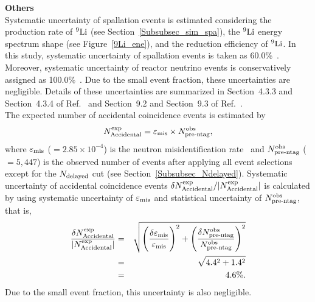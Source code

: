 \textbf{Others}\\
\hs
Systematic uncertainty of spallation events is estimated considering the production rate of $^{9}{\rm Li}$ (see Section~\ref{Subsubsec_sim_spa}), the $^{9}{\rm Li}$ energy spectrum shape (see Figure~\ref{9Li_ene}), and the reduction efficiency of $^{9}{\rm Li}$.
In this study, systematic uncertainty of spallation events is taken as 60.0\%~\cite{2023Harada}.
Moreover, systematic uncertainty of reactor neutrino events is conservatively assigned as 100.0\%~\cite{2023Harada}.
Due to the small event fraction, these uncertainties are negligible.
Details of these uncertainties are summarized in Section~4.3.3 and Section~4.3.4 of Ref.~\cite{2020Hedri} and Section~9.2 and Section~9.3 of Ref.~\cite{2023HaradaPhD}.\\
\hs
The expected number of accidental coincidence events is estimated by
\begin{eqnarray}
	N^{\rm exp}_{\rm Accidental} = \varepsilon_{\rm mis} \times N^{\rm obs}_{\rm pre\mathchar`-ntag},
\end{eqnarray}
where $\varepsilon_{\rm mis}$ ($=2.85 \times 10^{-4}$) is the neutron misidentification rate~\cite{2022HaradaSlide,2023Harada} and $N^{\rm obs}_{\rm pre\mathchar`-ntag}$ ($=5{,}447$) is the observed number of events after applying all event selections except for the $N_{\rm delayed}$ cut (see Section~\ref{Subsubsec_Ndelayed}).
Systematic uncertainty of accidental coincidence events $\delta N^{\rm exp}_{\rm Accidental}/|N^{\rm exp}_{\rm Accidental}|$ is calculated by using systematic uncertainty of $\varepsilon_{\rm mis}$ and statistical uncertainty of $N^{\rm obs}_{\rm pre\mathchar`-ntag}$, that is,
\begin{eqnarray}
	{\delta N^{\rm exp}_{\rm Accidental} \over |N^{\rm exp}_{\rm Accidental}|} &=& \sqrt{\Bigg({\delta \varepsilon_{\rm mis} \over \varepsilon_{\rm mis}}\Bigg)^{2} + \Bigg({\delta N^{\rm obs}_{\rm pre\mathchar`-ntag} \over N^{\rm obs}_{\rm pre\mathchar`-ntag}}\Bigg)^{2}} \nonumber \\
																																						 &=& \sqrt{4.4^2 + 1.4^2} \nonumber \\
																																						 &=& 4.6\%.
\end{eqnarray}
Due to the small event fraction, this uncertainty is also negligible.\\





